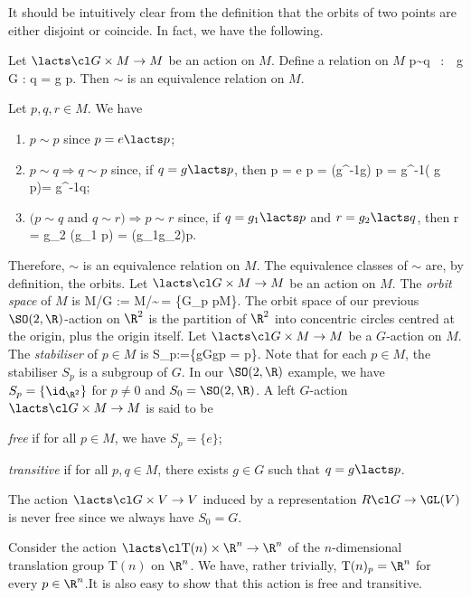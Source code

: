It should be intuitively clear from the definition that the orbits of two points are either disjoint or coincide. In fact, we have the following.

\bp
Let $\lacts \cl G\times M \to M$ be an action on $M$. Define a relation on $M$
\bse
p\sim q \ :\Leftrightarrow \ \exists \, g \in G : q = g \lacts p.
\ese
Then $\sim$ is an equivalence relation on $M$.
\ep

\bq
Let $p,q,r\in M$. We have
\begin{enumerate}[label=\roman*)]
\item $p\sim p$ since $p = e \lacts p$;
\item $p\sim q \Rightarrow q\sim p$ since, if $q =g \lacts p$, then
\bse
p = e \lacts p = (g^{-1}\bullet g) \lacts p = g^{-1}\lacts( g \lacts p)= g^{-1}\lacts q; 
\ese
\item $(p\sim q$ and $q\sim r) \Rightarrow p\sim r$ since, if $q =g_1 \lacts p$ and $r =g_2 \lacts q$, then
\bse
r = g_2 \lacts (g_1 \lacts p) = (g_1\bullet g_2)\lacts p.
\ese
\end{enumerate}
Therefore, $\sim$ is an equivalence relation on $M$.
\eq
The equivalence classes of $\sim$ are, by definition, the orbits.
\bd
Let $\lacts\cl G\times M\to M$ be an action on $M$. The \emph{orbit space} of $M$ is
\bse
M/G := M/\!\sim \,= \{G_p \mid p\in M\}.
\ese
\ed
\be
The orbit space of our previous $\SO(2,\R)$-action on $\R^2$ is the partition of $\R^2$ into concentric circles centred at the origin, plus the origin itself.
\ee
\bd
Let $\lacts\cl G\times M\to M$ be a $G$-action on $M$. The \emph{stabiliser} of $p\in M$ is
\bse
S_p:=\{g\in G\mid g\lacts p = p\}.
\ese
\ed
Note that for each $p\in M$, the stabiliser $S_p$ is a subgroup of $G$.
\be
In our $\SO(2,\R)$ example, we have $S_p=\{\id_{\R^2}\}$ for $p\neq 0$ and $S_0=\SO(2,\R)$.
\ee
\bd
A left $G$-action $\lacts\cl G\times M\to M$ is said to be
\ben[label=\roman*)]
\item \emph{free} if for all $p\in M$, we have $S_p=\{e\}$;
\item \emph{transitive} if for all $p,q\in M$, there exists $g\in G$ such that $q=g\lacts p$.
\een
\ed

\be
The action $\lacts\cl G\times V \to V$ induced by a representation $R\cl G\to \GL(V)$ is never free since we always have $S_0=G$.
\ee

\be
Consider the action $\lacts\cl \mathrm{T}(n)\times \R^n\to \R^n$ of the $n$-dimensional translation group $\mathrm{T}(n)$ on $\R^n$. We have, rather trivially, $\mathrm{T}(n)_p=\R^n$ for every $p\in \R^n$.It is also easy to show that this action is free and transitive. 
\ee


